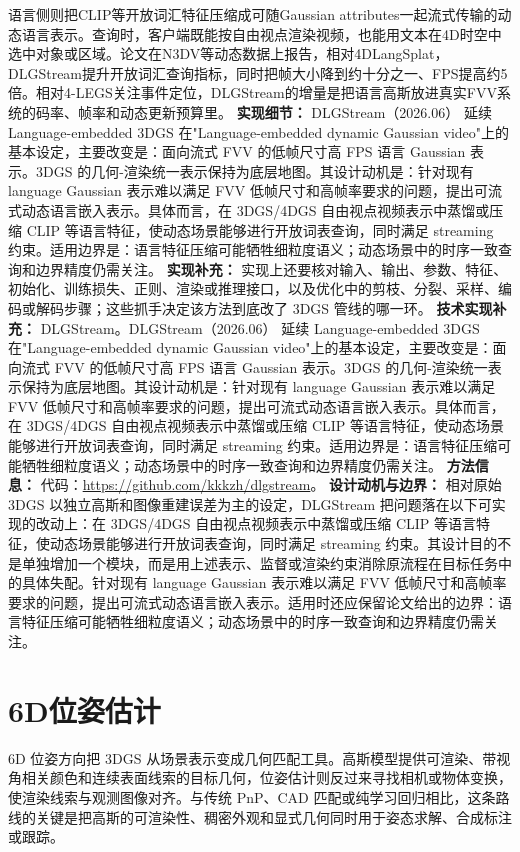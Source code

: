 语言侧则把CLIP等开放词汇特征压缩成可随Gaussian attributes一起流式传输的动态语言表示。查询时，客户端既能按自由视点渲染视频，也能用文本在4D时空中选中对象或区域。论文在N3DV等动态数据上报告，相对4DLangSplat，DLGStream提升开放词汇查询指标，同时把帧大小降到约十分之一、FPS提高约5倍。相对4-LEGS关注事件定位，DLGStream的增量是把语言高斯放进真实FVV系统的码率、帧率和动态更新预算里。
\textbf{实现细节：} DLGStream（2026.06） 延续 Language-embedded 3DGS 在"Language-embedded dynamic Gaussian video"上的基本设定，主要改变是：面向流式 FVV 的低帧尺寸高 FPS 语言 Gaussian 表示。3DGS 的几何-渲染统一表示保持为底层地图。其设计动机是：针对现有 language Gaussian 表示难以满足 FVV 低帧尺寸和高帧率要求的问题，提出可流式动态语言嵌入表示。具体而言，在 3DGS/4DGS 自由视点视频表示中蒸馏或压缩 CLIP 等语言特征，使动态场景能够进行开放词表查询，同时满足 streaming 约束。适用边界是：语言特征压缩可能牺牲细粒度语义；动态场景中的时序一致查询和边界精度仍需关注。
\textbf{实现补充：} 实现上还要核对输入、输出、参数、特征、初始化、训练损失、正则、渲染或推理接口，以及优化中的剪枝、分裂、采样、编码或解码步骤；这些抓手决定该方法到底改了 3DGS 管线的哪一环。
\textbf{技术实现补充：} DLGStream。DLGStream（2026.06） 延续 Language-embedded 3DGS 在"Language-embedded dynamic Gaussian video"上的基本设定，主要改变是：面向流式 FVV 的低帧尺寸高 FPS 语言 Gaussian 表示。3DGS 的几何-渲染统一表示保持为底层地图。其设计动机是：针对现有 language Gaussian 表示难以满足 FVV 低帧尺寸和高帧率要求的问题，提出可流式动态语言嵌入表示。具体而言，在 3DGS/4DGS 自由视点视频表示中蒸馏或压缩 CLIP 等语言特征，使动态场景能够进行开放词表查询，同时满足 streaming 约束。适用边界是：语言特征压缩可能牺牲细粒度语义；动态场景中的时序一致查询和边界精度仍需关注。
\textbf{方法信息：} 代码：\url{https://github.com/kkkzh/dlgstream}。
\textbf{设计动机与边界：} 相对原始 3DGS 以独立高斯和图像重建误差为主的设定，DLGStream 把问题落在以下可实现的改动上：在 3DGS/4DGS 自由视点视频表示中蒸馏或压缩 CLIP 等语言特征，使动态场景能够进行开放词表查询，同时满足 streaming 约束。其设计目的不是单独增加一个模块，而是用上述表示、监督或渲染约束消除原流程在目标任务中的具体失配。针对现有 language Gaussian 表示难以满足 FVV 低帧尺寸和高帧率要求的问题，提出可流式动态语言嵌入表示。适用时还应保留论文给出的边界：语言特征压缩可能牺牲细粒度语义；动态场景中的时序一致查询和边界精度仍需关注。

\section{6D位姿估计}

6D 位姿方向把 3DGS 从场景表示变成几何匹配工具。高斯模型提供可渲染、带视角相关颜色和连续表面线索的目标几何，位姿估计则反过来寻找相机或物体变换，使渲染线索与观测图像对齐。与传统 PnP、CAD 匹配或纯学习回归相比，这条路线的关键是把高斯的可渲染性、稠密外观和显式几何同时用于姿态求解、合成标注或跟踪。
